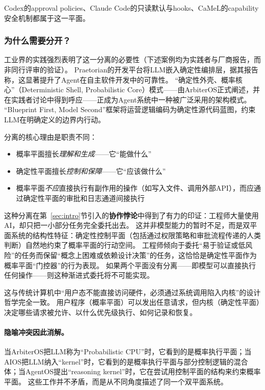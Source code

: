Codex的approval policies\cite{openai_codex_approvals_2026}、Claude Code的只读默认与hooks\cite{anthropic_claudecode_security_2026}、CaMeL的capability安全机制\cite{debenedetti2025camel}都属于这一平面。

\subsubsection{为什么需要分开？}

工业界的实践强烈表明了这一分离的必要性（下述案例均为实践者与厂商报告，而非同行评审的验证）。
Praetorian的开发平台将LLM嵌入确定性编排层，据其报告称，这显著提升了Agent在自主软件开发中的可靠性\cite{praetorian2025deterministic}。
``确定性外壳、概率核心''（Deterministic Shell, Probabilistic Core）模式——由ArbiterOS正式阐述\cite{arbiteros2025}，并在实践者讨论中得到呼应\cite{towardsai2025deterministicshell}——正成为Agent系统中一种被广泛采用的架构模式。
``Blueprint First, Model Second''框架将运营逻辑编码为确定性源代码蓝图，约束LLM在明确定义的边界内行动\cite{blueprintfirst2025}。

分离的核心理由是职责不同：
\begin{itemize}[nosep]
\item 概率平面擅长\textit{理解和生成}——它``能做什么''
\item 确定性平面擅长\textit{控制和保障}——它``应该做什么''
\item 概率平面\textit{不应}直接执行有副作用的操作（如写入文件、调用外部API），而应通过确定性平面的审批和日志通道间接执行
\end{itemize}

这种分离在第~\ref{sec:intro}节引入的\textbf{协作悖论}中得到了有力的印证：工程师大量使用AI，却只把一小部分任务完全委托出去\cite{anthropic2026agenticreport}。
这并非模型能力的暂时不足，而是双平面系统的结构性特征：确定性控制平面（包括通过权限策略和审批流程传递的人类判断）自然地约束了概率平面的行动空间。
工程师倾向于委托``易于验证或低风险''的任务而保留``概念上困难或依赖设计决策''的任务，这恰恰是确定性平面作为概率平面``门控器''的行为表现。
如果两个平面没有分离——即模型可以直接执行任何操作——则这种渐进式委托将不可能实现。

这与传统计算机中``用户态不能直接访问硬件，必须通过系统调用陷入内核''的设计哲学完全一致\cite{ostep_2023}。
用户程序（概率平面）可以发出任意请求，但内核（确定性平面）决定哪些请求被允许、以什么优先级执行、如何记录和恢复。

\paragraph{隐喻冲突因此消解。}
当ArbiterOS把LLM称为``Probabilistic CPU''时，它看到的是概率执行平面；当AIOS把LLM纳入``kernel''时，它看到的是概率执行平面与部分控制逻辑的混合体；当AgentOS提出``reasoning kernel''时，它在尝试用控制平面的结构来约束概率平面。
这些工作并不矛盾，而是从不同角度描述了同一个双平面系统。


